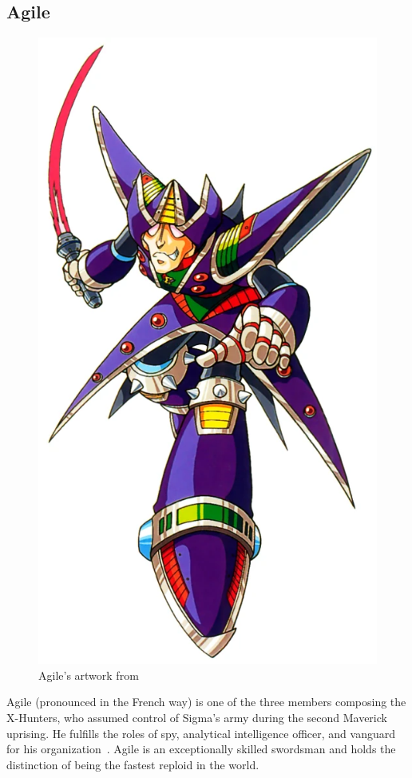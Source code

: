 \subsection{Agile}\label{boss:Agile}
\begin{figure}[htp]
	\centering
	\includegraphics[height=\portraitsize]{figures/X2/Hunter_stages/Agile.png}
	\caption{Agile's artwork from~\cite{book:MMX_Complete_art}}
\end{figure}
Agile (pronounced in the French way) is one of the three members composing the X-Hunters, who assumed control of Sigma's army during the second Maverick uprising. He fulfills the roles of spy, analytical intelligence officer, and vanguard for his organization~\cite{MHX:manual,wayback:X2_resources}. Agile is an exceptionally skilled swordsman and holds the distinction of being the fastest reploid in the world.


